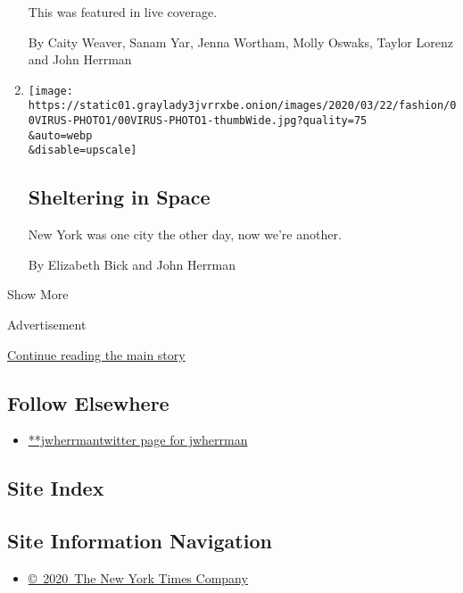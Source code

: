 \begin{enumerate}
  This was featured in live coverage.

  By Caity Weaver, Sanam Yar, Jenna Wortham, Molly Oswaks, Taylor Lorenz
  and John Herrman
\item
  \href{/2020/03/18/style/coronavirus-social-distancing-new-york.html}{}

  \texttt{[image: https://static01.graylady3jvrrxbe.onion/images/2020/03/22/fashion/00VIRUS-PHOTO1/00VIRUS-PHOTO1-thumbWide.jpg?quality=75\\\&auto=webp\\\&disable=upscale]}

  \hypertarget{sheltering-in-space}{%
  \subsection{Sheltering in Space}\label{sheltering-in-space}}

  New York was one city the other day, now we're another.

  By Elizabeth Bick and John Herrman
\end{enumerate}

Show More

Advertisement

\protect\hyperlink{after-mid2}{Continue reading the main story}

\hypertarget{follow-elsewhere}{%
\subsection{Follow Elsewhere}\label{follow-elsewhere}}

\begin{itemize}
\tightlist
\item
  \href{https://twitter.com/jwherrman}{**jwherrmantwitter page for
  jwherrman}
\end{itemize}

\hypertarget{site-index}{%
\subsection{Site Index}\label{site-index}}

\hypertarget{site-information-navigation}{%
\subsection{Site Information
Navigation}\label{site-information-navigation}}

\begin{itemize}
\tightlist
\item
  \href{https://help.nytimes3xbfgragh.onion/hc/en-us/articles/115014792127-Copyright-notice}{©~2020~The
  New York Times Company}
\end{itemize}

